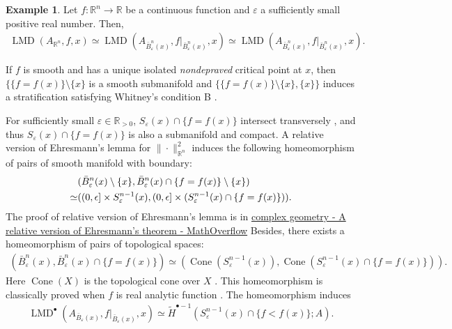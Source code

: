 \documentclass[a4paper,dvipdfmx,reqno,12pt]{amsart}
\theoremstyle{definition}
\newtheorem{example}[theorem]{Example}
\newcommand{\opn}[1]{\operatorname{#1}}
\numberwithin{equation}{section}
\begin{document}
\begin{example}
Let $f\colon \mathbb{R}^{n}\to \mathbb{R}$ be a 
continuous function and 
$\varepsilon$ a 
sufficiently small positive real number. Then, 
\begin{align}
\opn{LMD}(A_{\mathbb{R}^{n}},f,x)\simeq 
\opn{LMD}(A_{\bar{B}_{\varepsilon}^{n}(x)},
f|_{\bar{B}_{\varepsilon}^{n}(x)},x) \simeq 
\opn{LMD}(A_{\bar{B}_{\varepsilon}^{n}(x)},
f|_{\bar{B}_{\varepsilon}^{n}(x)},x).
\end{align}

If $f$ is smooth and has a unique isolated \emph{nondepraved} 
critical point at $x$, then 
$\{\{f=f(x)\}\setminus \{x\}$ is a smooth submanifold 
and $\{\{f=f(x)\}\setminus \{x\},\{x\} \}$ induces 
a stratification satisfying Whitney's condition B
\cite[Part I.2.5.1. Lemma]{MR932724}. 

For sufficiently small $\varepsilon\in \mathbb{R}_{> 0}$, 
$S_{\varepsilon}(x) \cap \{f=f(x)\}$ 
intersect transversely \cite[Part I.3.5.1. Lemma]{MR932724},
and thus $S_{\varepsilon}(x) \cap \{f=f(x)\}$
is also a submanifold and compact.
A relative version of Ehresmann's lemma for 
$\|\cdot\|_{\mathbb{R}^{n}}^2$ induces the 
following homeomorphism of pairs of smooth manifold 
with boundary:
\begin{align}
&(\bar{B}_{\varepsilon}^{n}(x)\setminus \{x\}, 
 \bar{B}_{\varepsilon}^{n}(x)\cap \{f=f(x)\} \setminus \{x\}) \\ 
\simeq & ((0,\epsilon] \times S_{\varepsilon}^{n-1}(x),
(0,\epsilon] \times
(S_{\varepsilon}^{n-1}(x) \cap \{f=f(x)\})). \notag
\end{align}
The proof of relative version of Ehresmann's lemma is 
in 
\href{https://mathoverflow.net/questions/358543/a-relative-version-of-ehresmanns-theorem}{complex geometry - A relative version of Ehresmann's theorem - MathOverflow}
Besides, there exists a homeomorphism of pairs of
topological spaces:
\begin{align}
(\bar{B}_{\varepsilon}^{n}(x),
\bar{B}_{\varepsilon}^{n}(x)\cap \{f=f(x)\})
\simeq (\opn{Cone}(S_{\varepsilon}^{n-1}(x)),
\opn{Cone}(S_{\varepsilon}^{n-1}(x) \cap \{f=f(x)\})).
\end{align}
Here $\opn{Cone}(X)$ is the topological cone over
$X$ \cite[Example 4.4]{hatcherAlgebraicTopology2002a}.
This homeomorphism is classically proved when 
$f$ is real analytic function
\cite[Theorem 2.10]{MR0239612}.
The homeomorphism induces 
\begin{align}
\opn{LMD}^{\bullet}(A_{\bar{B}_{\varepsilon}(x)},
f|_{\bar{B}_{\varepsilon}(x)},x)\simeq 
\tilde{H}^{\bullet-1}(S_{\varepsilon}^{n-1}(x)
\cap \{f<f(x)\};A).
\end{align}


\end{example}
\end{document}

